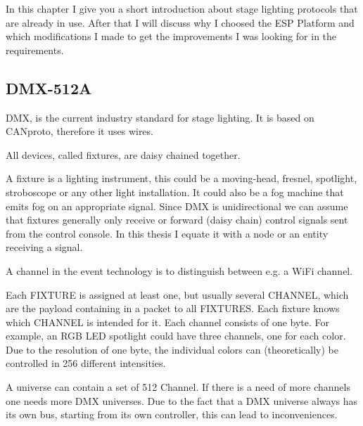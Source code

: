 \documentclass[]{ccs-thesis}
\begin{document}
In this chapter I give you a short introduction about stage lighting protocols that are already in use. 
After that I will discuss why I choosed the ESP Platform and which modifications I made to get the improvements I was looking for in the requirements.

\subsection*{DMX-512A}
\ac{DMX}, is the current industry standard for stage lighting. It is based on \ac{CANproto}, therefore it uses wires.

All devices, called fixtures, are daisy chained together.

A fixture is a lighting instrument, 
this could be a moving-head, fresnel, spotlight, stroboscope or any other light installation.
It could also be a fog machine that emits fog on an appropriate signal.
Since \ac{DMX} is unidirectional we  can assume that fixtures generally only receive or forward (daisy chain) control signals sent from the control console.
In this thesis I equate it with a node or an entity receiving a signal.

A channel in the event technology is to distinguish between e.g. a WiFi channel. 

Each FIXTURE is assigned at least one, but usually several CHANNEL, which are the payload containing in a packet to all FIXTURES. 
Each fixture knows which CHANNEL is intended for it. Each channel consists of one byte.
For example, an RGB LED spotlight could have three channels, one for each color.
Due to the resolution of one byte, the individual colors can (theoretically) be controlled in 256 different intensities.

A universe can contain a set of 512 Channel. If there is a need of more channels one needs more DMX universes.
Due to the fact that a DMX universe always has its own bus, starting from its own controller, this can lead to inconveniences.
\end{document}
